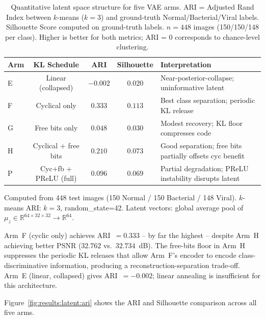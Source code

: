 \documentclass[12pt, a4paper, twoside, openright]{book}
\begin{document}
\begin{table}[htbp]
\centering
\caption[Latent space clustering metrics -- VAE arms]{%
  Quantitative latent space structure for five VAE arms. ARI = Adjusted Rand Index
  between $k$-means ($k=3$) and ground-truth Normal/Bacterial/Viral labels.
  Silhouette Score computed on ground-truth labels. $n=448$ images (150/150/148 per class).
  Higher is better for both metrics; ARI = 0 corresponds to chance-level clustering.}
\label{tab:results:latent:quant}
\begin{tabular}{lcccl}
\toprule
\textbf{Arm} & \textbf{KL Schedule} & \textbf{ARI} & \textbf{Silhouette} & \textbf{Interpretation} \\
\midrule
E & Linear (collapsed)       & $-0.002$ & $0.020$ & Near-posterior-collapse; uninformative latent \\
F & Cyclical only             & $\mathbf{0.333}$ & $\mathbf{0.113}$ & Best class separation; periodic KL release \\
G & Free bits only            & $0.048$ & $0.030$ & Modest recovery; KL floor compresses code \\
H & Cyclical + free bits      & $0.210$ & $0.073$ & Good separation; free bits partially offsets cyc benefit \\
P & Cyc+fb + PReLU (full)     & $0.096$ & $0.069$ & Partial degradation; PReLU instability disrupts latent \\
\bottomrule
\end{tabular}
\begin{tablenotes}\small
\item Computed from 448 test images (150 Normal / 150 Bacterial / 148 Viral).
  $k$-means ARI: $k=3$, random\_state=42. Latent vectors: global average pool of
  $\mu_z \in \mathbb{R}^{64 \times 32 \times 32} \to \mathbb{R}^{64}$.
\end{tablenotes}
\end{table}

Arm~F (cyclic only) achieves ARI~$=0.333$ -- by far the highest -- despite Arm~H achieving better PSNR ($32.762$ vs.\ $32.734$~dB). The free-bits floor in Arm~H suppresses the periodic KL releases that allow Arm~F's encoder to encode class-discriminative information, producing a reconstruction-separation trade-off. Arm~E (linear, collapsed) gives ARI~$=-0.002$; linear annealing is insufficient for this architecture.

Figure~\ref{fig:results:latent:ari} shows the ARI and Silhouette comparison across all five arms.
\end{document}
